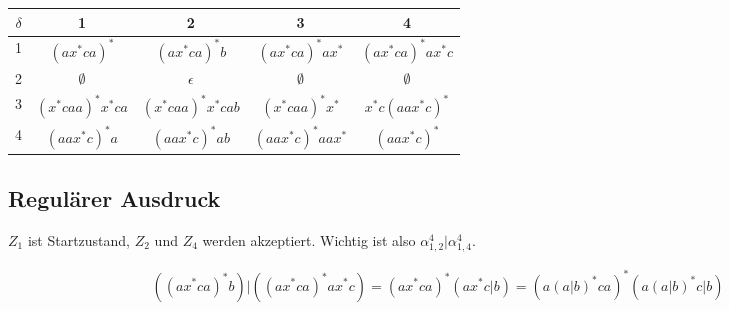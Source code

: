 \documentclass{article}
\begin{document}
\begin{center}
\begin{tabular}{c||*{3}{c|}c}
$\delta$ & 1 & 2 & 3 & 4 \\
  \hline \hline
1 & $\left(ax^*ca\right)^*$      & $\left(ax^*ca\right)^*b$      & $(ax^*ca)^*ax^*$             & $\left(ax^*ca\right)^*ax^*c$ \\ \hline
2 & $\emptyset$                  & $\epsilon$                    & $\emptyset$                  & $\emptyset$                  \\ \hline
3 & $\left(x^*caa\right)^*x^*ca$ & $\left(x^*caa\right)^*x^*cab$ & $\left(x^*caa\right)^*x^*$   & $x^*c\left(aax^*c\right)^*$  \\ \hline
4 & $\left(aax^*c\right)^*a$     & $\left(aax^*c\right)^*ab$     & $\left(aax^*c\right)^*aax^*$ & $\left(aax^*c\right)^*$      \\
\end{tabular}
\end{center}

\subsection*{Regulärer Ausdruck}
$Z_1$ ist Startzustand, $Z_2$ und $Z_4$ werden akzeptiert. Wichtig ist also $\alpha^4_{1,2}|\alpha^4_{1,4}$.

\begin{align*}
\left(\left(ax^*ca\right)^*b\right)|\left(\left(ax^*ca\right)^*ax^*c\right) = \left(ax^*ca\right)^*\left(ax^*c|b\right) = \left(a\left(a|b\right)^*ca\right)^*\left(a\left(a|b\right)^*c|b\right)
\end{align*}
\end{document}
